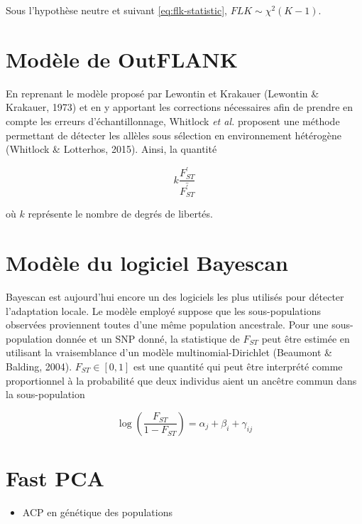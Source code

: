 \documentclass[12pt,twoside]{reedthesis}
\providecommand{\tightlist}{%
  \setlength{\itemsep}{0pt}\setlength{\parskip}{0pt}}
\begin{document}
  Sous l'hypothèse neutre et suivant \eqref{eq:flk-statistic},
  \(FLK \sim \chi^2 (K - 1)\).
  
  \section{Modèle de OutFLANK}\label{modele-de-outflank}
  
  En reprenant le modèle proposé par Lewontin et Krakauer (Lewontin \&
  Krakauer, 1973) et en y apportant les corrections nécessaires afin de
  prendre en compte les erreurs d'échantillonnage, Whitlock
  \textit{et al.} proposent une méthode permettant de détecter les allèles
  sous sélection en environnement hétérogène (Whitlock \& Lotterhos,
  2015). Ainsi, la quantité
  
  \begin{equation} 
    k \frac{F_{ST}^{\prime}}{\bar{{F_{ST}^{\prime}}}}  
    \label{eq:OutFLANK-statistic}
  \end{equation}
  
  où \(k\) représente le nombre de degrés de libertés.
  
  \section{Modèle du logiciel Bayescan}\label{modele-du-logiciel-bayescan}
  
  Bayescan est aujourd'hui encore un des logiciels les plus utilisés pour
  détecter l'adaptation locale. Le modèle employé suppose que les
  sous-populations observées proviennent toutes d'une même population
  ancestrale. Pour une sous-population donnée et un SNP donné, la
  statistique de \(F_{ST}\) peut être estimée en utilisant la
  vraisemblance d'un modèle multinomial-Dirichlet (Beaumont \& Balding,
  2004). \(F_{ST} \in [0, 1]\) est une quantité qui peut être interprété
  comme proportionnel à la probabilité que deux individus aient un ancêtre
  commun dans la sous-population
  
  \begin{equation} 
    \log \left( \frac{F_{ST}}{1 - F_{ST}} \right) = \alpha_j + \beta_i + \gamma_{ij}
    \label{eq:Bayescan-statistic}
  \end{equation}
  
  \section{Fast PCA}\label{fast-pca}
  
  \begin{itemize}
  \tightlist
  \item
    ACP en génétique des populations
  \end{itemize}
  
\end{document}
